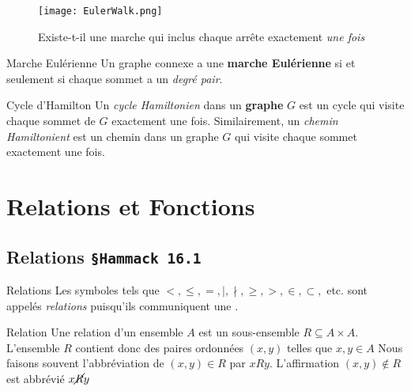 \documentclass[16pt]{report}
\begin{document}
\begin{multicols*}{2}
            \begin{figure}[H]
                \begin{center}
                    \texttt{[image: EulerWalk.png]}
                \end{center}
                \caption{Existe-t-il une marche qui inclus chaque arrête exactement \textit{une fois}}
            \end{figure}

            \begin{Theorem}{Marche Eulérienne}{}
                Un graphe connexe a une \textbf{marche Eulérienne} si et seulement si chaque sommet a un \textit{degré 
                pair}.
            \end{Theorem}
            

            \begin{Theorem}{Cycle d'Hamilton}{}
                Un \textit{cycle Hamiltonien} dans un \textbf{graphe} $G$ est un cycle qui visite chaque 
                sommet de $G$ exactement une fois. Similairement, un \textit{chemin Hamiltonient} est un chemin 
                dans un graphe $G$ qui visite chaque sommet exactement une fois. 
            \end{Theorem}


    \chapter{Relations et Fonctions}

    \section{Relations \texttt{\small{\S Hammack 16.1}}}


            \begin{Concept}{Relations}{}
               Les symboles tels que $<, \leq, =, |, \nmid, \geq, >, \in, \subset,$ etc. sont appelés 
               \textit{relations} puisqu'ils communiquent une 
               . 
            \end{Concept}


            \begin{Definitionx}{Relation}{}
                Une relation d'un ensemble $A$ est un sous-ensemble $R \subseteq A \times A$. 
                L'ensemble $R$ contient donc des paires ordonnées $(x, y)$ telles que $x, y \in A$ 
                Nous faisons 
                souvent l'abbréviation de $ (x,y) \in R$ par $xRy$. L'affirmation 
                $(x,y) \notin R$ est abbrévié $x\cancel{R}y$


\end{Definitionx}
\end{multicols*}
\end{document}
